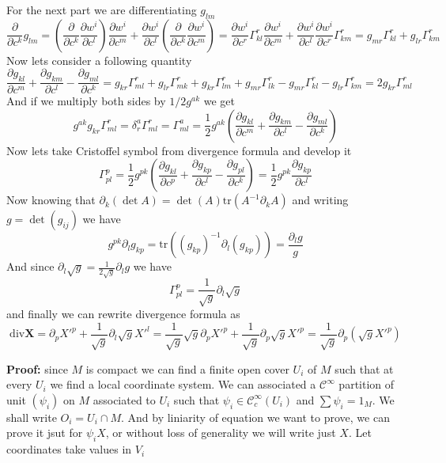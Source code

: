 For the next part we are differentiating $g_{lm}$
\[\frac{\partial}{\partial c^k}g_{lm}=(\frac{\partial}{\partial c^k}\frac{\partial w^i}{\partial c^l})\frac{\partial w^i}{\partial c^m}
+\frac{\partial w^i}{\partial c^l}(\frac{\partial}{\partial c^k}\frac{\partial w^i}{\partial c^m})
=\frac{\partial w^i}{\partial c^r}\Gamma^r_{kl}\frac{\partial w^i}{\partial c^m}+
\frac{\partial w^i}{\partial c^l}\frac{\partial w^i}{\partial c^r}\Gamma^r_{km}
=g_{mr}\Gamma^r_{kl}+g_{lr}\Gamma^r_{km}\]
Now lets consider a following quantity
\[\frac{\partial g_{kl}}{\partial c^m}+\frac{\partial g_{km}}{\partial c^l}-\frac{\partial g_{ml}}{\partial c^k}
=g_{kr}\Gamma^r_{ml}+g_{lr}\Gamma^r_{mk}+g_{kr}\Gamma^r_{lm}+g_{mr}\Gamma^r_{lk}-g_{mr}\Gamma^r_{kl}-g_{lr}\Gamma^r_{km}=2g_{kr}\Gamma^r_{ml}
\]
And if we multiply both sides by $1/2g^{ak}$ we get
\[g^{ak}g_{kr}\Gamma^r_{ml}=\delta_r^a\Gamma^r_{ml}=\Gamma^a_{ml}=\frac{1}{2}g^{ak}(\frac{\partial g_{kl}}{\partial c^m}+\frac{\partial g_{km}}{\partial c^l}-\frac{\partial g_{ml}}{\partial c^k})\]
Now lets take Cristoffel symbol from divergence formula and develop it
\[\Gamma^p_{pl}=\frac{1}{2}g^{pk}(\frac{\partial g_{kl}}{\partial c^p}+\frac{\partial g_{kp}}{\partial c^l}-\frac{\partial g_{pl}}{\partial c^k})
=\frac{1}{2}g^{pk}\frac{\partial g_{kp}}{\partial c^l}\]
Now knowing that $\partial_k(\det A)=\det(A)\text{tr}(A^{-1}\partial_k A)$ and
writing $g=\det(g_{ij})$ we have
\[g^{pk}\partial_l g_{kp}=\text{tr}((g_{kp})^{-1}\partial_l(g_{kp}))=\frac{\partial_l g}{g}\]
And since $\partial_l\sqrt g=\frac{1}{2\sqrt g}\partial_l g$ we have
\[\Gamma^p_{pl}=\frac{1}{\sqrt g}\partial_l\sqrt g\]
and finally we can rewrite divergence formula as
\[\text{div}\mathbf X=\partial_p X'^p+\frac{1}{\sqrt g}\partial_l\sqrt g X'^l
=\frac{1}{\sqrt g}\sqrt g\partial_p X'^p+\frac{1}{\sqrt g}\partial_p\sqrt g X'^p
=\frac{1}{\sqrt g}\partial_p(\sqrt g X'^p)
\]

\vspace{1ex}
\textbf{Proof:} since $M$ is compact we can find a finite open cover $U_i$ of
$M$ such that at every $U_i$ we find a local coordinate system. We can associated
a $\mathcal C^\infty$ partition of unit $(\psi_i)$ on $M$ associated to $U_i$ such
that $\psi_i\in\mathcal C^\infty_c(U_i)$ and $\sum\psi_i=1_M$. We shall write
$O_i=U_i\cap M$. And by liniarity of equation we want to prove, we can prove it
jsut for $\psi_iX$, or without loss of generality we will write just $X$. Let
coordinates take values in $V_i$

